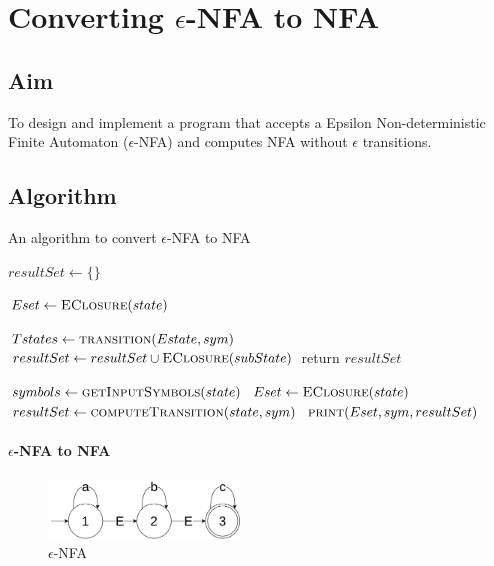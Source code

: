 \clearpage
\chapter{Converting $\epsilon$-NFA to NFA}

\section{Aim}
To design and implement a program that accepts a Epsilon Non-deterministic Finite Automaton ($\epsilon$-NFA) and computes NFA without $\epsilon$ transitions.

\section{Algorithm}

\begin{algorithm}[H]
	\caption{An algorithm to convert $\epsilon$-NFA to NFA }
	\begin{algorithmic}
			\State {}
			\State {}
			
			\State $resultSet \gets \{\}$ 
			
			\State $Eset \gets \Call{EClosure}{state}$ 
			
			
				\State $Tstates \gets \Call{transition}{Estate,sym}$ 
					\State $resultSet \gets resultSet \cup \Call{EClosure}{subState}$ 
				\EndFor
			\EndFor
			\State return $resultSet$
		\EndProcedure

			\State $symbols \gets \Call{getInputSymbols}{state}$ 
				\State $Eset \gets \Call{EClosure}{state}$
				\State $resultSet \gets \Call{computeTransition}{state, sym}$
				\State $\Call{print}{Eset, sym, resultSet}$
			\EndFor
		\EndFor
	\end{algorithmic}
\end{algorithm}

\subsubsection*{$\epsilon$-NFA to NFA}

\begin{figure}[H]
	\centering
	\includegraphics[width=2in]{../EXP5/diagram-ques.png}
	\caption{$\epsilon$-NFA}
\end{figure}

